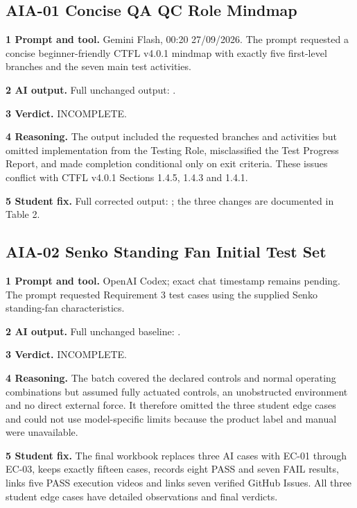 \subsection{AIA-01 Concise QA QC Role Mindmap}

\textbf{1 Prompt and tool.} Gemini Flash, 00:20 27/09/2026. The prompt requested a concise beginner-friendly CTFL v4.0.1 mindmap with exactly five first-level branches and the seven main test activities.

\textbf{2 AI output.} Full unchanged output: .

\textbf{3 Verdict.} INCOMPLETE.

\textbf{4 Reasoning.} The output included the requested branches and activities but omitted implementation from the Testing Role, misclassified the Test Progress Report, and made completion conditional only on exit criteria. These issues conflict with CTFL v4.0.1 Sections 1.4.5, 1.4.3 and 1.4.1.

\textbf{5 Student fix.} Full corrected output: ; the three changes are documented in Table 2.

\subsection{AIA-02 Senko Standing Fan Initial Test Set}

\textbf{1 Prompt and tool.} OpenAI Codex; exact chat timestamp remains pending. The prompt requested Requirement 3 test cases using the supplied Senko standing-fan characteristics.

\textbf{2 AI output.} Full unchanged baseline: .

\textbf{3 Verdict.} INCOMPLETE.

\textbf{4 Reasoning.} The batch covered the declared controls and normal operating combinations but assumed fully actuated controls, an unobstructed environment and no direct external force. It therefore omitted the three student edge cases and could not use model-specific limits because the product label and manual were unavailable.

\textbf{5 Student fix.} The final workbook replaces three AI cases with EC-01 through EC-03, keeps exactly fifteen cases, records eight PASS and seven FAIL results, links five PASS execution videos and links seven verified GitHub Issues. All three student edge cases have detailed observations and final verdicts.

